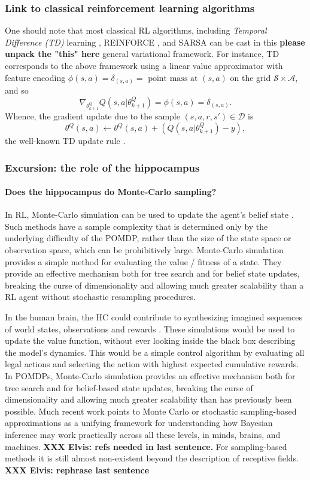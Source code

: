 \documentclass[10pt,letterpaper]{article}
\begin{document}
\subsubsection{Link to classical reinforcement learning algorithms} One should note that most classical RL algorithms, including \textit{Temporal Difference (TD)}
learning \citep{sutton1998reinforcement}, REINFORCE \citep{williams1992}, and SARSA can be
cast in this \textbf{please unpack the "this" here}
general variational framework. For instance, TD corresponds to
the above framework using a linear value approximator with feature encoding
$\phi(s,a) = \delta_{(s,a)} =  \text{ point mass at }(s,a)$ on the grid
$\mathcal S \times \mathcal A$, and so
$$\nabla_{\theta^Q_{k+1}}Q(s, a|\theta^Q_{k+1}) = \phi(s, a) = \delta_{(s,a)}.$$
Whence, the gradient update due to the sample $(s,a,r,s') \in \mathcal D$ is
$$\theta^Q(s,a) \leftarrow \theta^Q(s,a) + (Q(s, a|\theta^Q_{k+1}) - y),$$
the well-known TD update rule \citep{sutton1998reinforcement}.

\subsubsection{Excursion: the role of the hippocampus}
\paragraph{Does the hippocampus do Monte-Carlo sampling?}
In RL, Monte-Carlo simulation can be used to update the agent's belief state
\citep{silver2010monte}. Such methods have a sample complexity that is determined only by the underlying difficulty of the POMDP, rather than the size of the state space or observation space,
which can be prohibitively large.
Monte-Carlo simulation provides a simple method for evaluating the value / fitness of a state.
They provide an effective mechanism both for tree search and for belief state updates, breaking the curse of dimensionality and allowing much greater scalability than a RL agent without stochastic resampling procedures.

In the human brain,
the HC could contribute to synthesizing imagined sequences of world states,
observations and rewards \citep{aronov2017}.
These simulations would be used to update the value function, without ever looking inside the black box describing the model's dynamics. This would be a simple control algorithm by evaluating all legal actions and selecting the action with
highest expected cumulative rewards.
In POMDPs, Monte-Carlo simulation provides an effective mechanism both for tree search and for belief-based state updates, breaking the curse of dimensionality and allowing much greater scalability than has previously been possible.
Much recent work points to Monte Carlo or stochastic sampling-based approximations as a unifying framework for understanding how Bayesian inference may work practically across all these levels, in minds, brains, and machines. \textbf{XXX Elvis: refs needed in last sentence.} For sampling-based methods it is still almost non-existent beyond the description of receptive fields. \textbf{XXX Elvis: rephrase last sentence}
\end{document}
